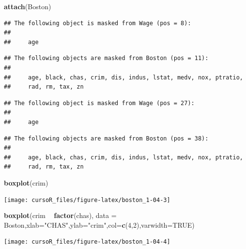 \documentclass[]{book}
\newenvironment{Shaded}{\begin{snugshade}}{\end{snugshade}}
\newcommand{\KeywordTok}[1]{\textcolor[rgb]{0.13,0.29,0.53}{\textbf{#1}}}
\newcommand{\DataTypeTok}[1]{\textcolor[rgb]{0.13,0.29,0.53}{#1}}
\newcommand{\DecValTok}[1]{\textcolor[rgb]{0.00,0.00,0.81}{#1}}
\newcommand{\StringTok}[1]{\textcolor[rgb]{0.31,0.60,0.02}{#1}}
\newcommand{\OtherTok}[1]{\textcolor[rgb]{0.56,0.35,0.01}{#1}}
\newcommand{\OperatorTok}[1]{\textcolor[rgb]{0.81,0.36,0.00}{\textbf{#1}}}
\newcommand{\NormalTok}[1]{#1}
\begin{document}
\begin{Shaded}
\begin{Highlighting}[]
\KeywordTok{attach}\NormalTok{(Boston)}
\end{Highlighting}
\end{Shaded}

\begin{verbatim}
## The following object is masked from Wage (pos = 8):
## 
##     age
\end{verbatim}

\begin{verbatim}
## The following objects are masked from Boston (pos = 11):
## 
##     age, black, chas, crim, dis, indus, lstat, medv, nox, ptratio,
##     rad, rm, tax, zn
\end{verbatim}

\begin{verbatim}
## The following object is masked from Wage (pos = 27):
## 
##     age
\end{verbatim}

\begin{verbatim}
## The following objects are masked from Boston (pos = 38):
## 
##     age, black, chas, crim, dis, indus, lstat, medv, nox, ptratio,
##     rad, rm, tax, zn
\end{verbatim}

\begin{Shaded}
\begin{Highlighting}[]
\KeywordTok{boxplot}\NormalTok{(crim)}
\end{Highlighting}
\end{Shaded}

\begin{center}\texttt{[image: cursoR\_files/figure-latex/boston\_1-04-3]} \end{center}

\begin{Shaded}
\begin{Highlighting}[]
\KeywordTok{boxplot}\NormalTok{(crim }\OperatorTok{~}\StringTok{ }\KeywordTok{factor}\NormalTok{(chas), }\DataTypeTok{data =}\NormalTok{ Boston,}\DataTypeTok{xlab=}\StringTok{"CHAS"}\NormalTok{,}\DataTypeTok{ylab=}\StringTok{"crim"}\NormalTok{,}\DataTypeTok{col=}\KeywordTok{c}\NormalTok{(}\DecValTok{4}\NormalTok{,}\DecValTok{2}\NormalTok{),}\DataTypeTok{varwidth=}\OtherTok{TRUE}\NormalTok{)}
\end{Highlighting}
\end{Shaded}

\begin{center}\texttt{[image: cursoR\_files/figure-latex/boston\_1-04-4]} \end{center}
\end{document}
